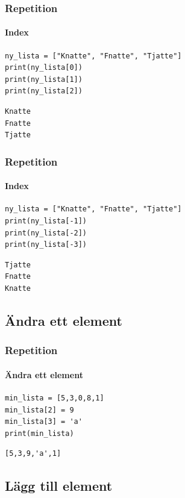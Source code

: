 \documentclass[aspectratio=169]{beamer}
\begin{document}
\begin{frame}[fragile]
	\frametitle{Repetition}
	\framesubtitle{Index}
	
	\begin{lstlisting}
ny_lista = ["Knatte", "Fnatte", "Tjatte"]
print(ny_lista[0])
print(ny_lista[1])
print(ny_lista[2])
	\end{lstlisting}
	
	\pause
	
	\begin{lstlisting}
Knatte
Fnatte
Tjatte
	\end{lstlisting}
	
\end{frame}

\begin{frame}[fragile]
	\frametitle{Repetition}
	\framesubtitle{Index}
	
	\begin{lstlisting}
ny_lista = ["Knatte", "Fnatte", "Tjatte"]
print(ny_lista[-1])
print(ny_lista[-2])
print(ny_lista[-3])
	\end{lstlisting}
	
	\pause
	
	\begin{lstlisting}
Tjatte
Fnatte
Knatte
	\end{lstlisting}
	
\end{frame}

\subsection{Ändra ett element}

\begin{frame}[fragile]
	\frametitle{Repetition}
	\framesubtitle{Ändra ett element}
	
	\begin{lstlisting}
min_lista = [5,3,0,8,1]
min_lista[2] = 9
min_lista[3] = 'a'
print(min_lista)
	\end{lstlisting}
	
	\pause
	
	\begin{lstlisting}
[5,3,9,'a',1]
	\end{lstlisting}
	
\end{frame}

\subsection{Lägg till element}
\end{document}
